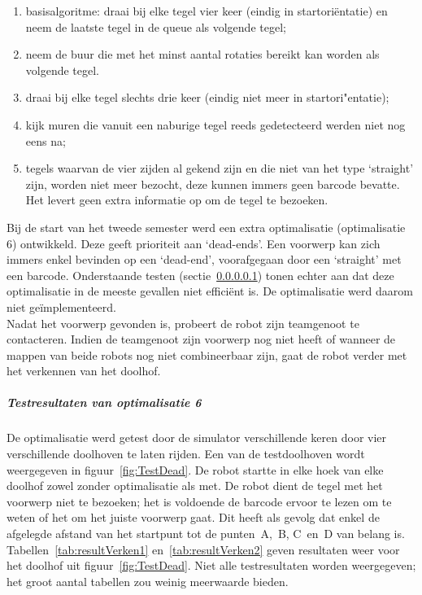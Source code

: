 \documentclass[eind]{penoverslag}
\begin{document}
\begin{enumerate}
\item basisalgoritme: draai bij elke tegel vier keer (eindig in startori\"entatie) en neem de laatste tegel in de queue als volgende tegel;
\item neem de buur die met het minst aantal rotaties bereikt kan worden als volgende tegel.
\item draai bij elke tegel slechts drie keer (eindig niet meer in startori"entatie);
\item kijk muren die vanuit een naburige tegel reeds gedetecteerd werden niet nog eens na;
\item tegels waarvan de vier zijden al gekend zijn en die niet van het type `straight' zijn, worden niet meer bezocht, deze kunnen immers geen barcode bevatte. Het levert geen extra informatie op om de tegel te bezoeken.
\end{enumerate}

Bij de start van het tweede semester werd een extra optimalisatie (optimalisatie 6) ontwikkeld. Deze geeft prioriteit aan `dead-ends'. Een voorwerp kan zich immers enkel bevinden op een `dead-end', voorafgegaan door een `straight' met een barcode. Onderstaande testen (sectie~\ref{par:AlgoZoekTest}) tonen echter aan dat deze optimalisatie in de meeste gevallen niet effici\"ent is. De optimalisatie werd daarom niet ge\"implementeerd.\\

Nadat het voorwerp gevonden is, probeert de robot zijn teamgenoot te contacteren. Indien de teamgenoot zijn voorwerp nog niet heeft of wanneer de mappen van beide robots nog niet combineerbaar zijn, gaat de robot verder met het verkennen van het doolhof.

\subparagraph{Testresultaten van optimalisatie 6}
\label{par:AlgoZoekTest}

De optimalisatie werd getest door de simulator verschillende keren door vier verschillende doolhoven te laten rijden. Een van de testdoolhoven wordt weergegeven in figuur~\ref{fig:TestDead}. De robot startte in elke hoek van elke doolhof zowel zonder optimalisatie als met. De robot dient de tegel met het voorwerp niet te bezoeken; het is voldoende de barcode ervoor te lezen om te weten of het om het juiste voorwerp gaat. Dit heeft als gevolg dat enkel de afgelegde afstand van het startpunt tot de punten~A,~B, C~en~D van belang is. Tabellen~\ref{tab:resultVerken1} en~\ref{tab:resultVerken2} geven resultaten weer voor het doolhof uit figuur~\ref{fig:TestDead}. Niet alle testresultaten worden weergegeven; het groot aantal tabellen zou weinig meerwaarde bieden.\\
\end{document}
